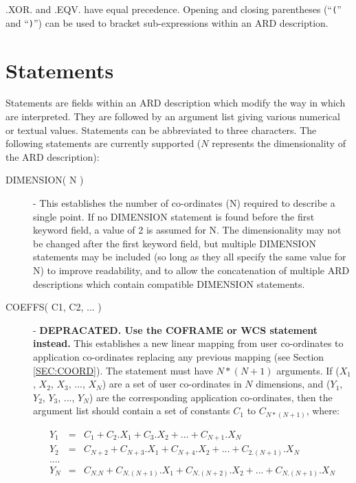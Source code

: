 .XOR. and .EQV. have equal precedence. Opening and closing parentheses
(``\verb+(+'' and ``\verb+)+'') can be used to bracket sub-expressions within 
an ARD description. 

\section{\label{SEC:STAT}Statements}
Statements are fields within an ARD description which modify the way in
which  are interpreted. They are followed by
an argument list giving various numerical or textual values. Statements can be
abbreviated to three characters. The following statements are currently
supported ($N$ represents the dimensionality of the ARD description):

\begin{description}

\item [\label{ST:DIM}DIMENSION( N )] - This establishes the number of
co-ordinates (N) required to describe a single point. If no DIMENSION
statement is found before the first keyword field, a value of 2 is
assumed for N. The dimensionality may not be changed after the first
keyword field, but multiple DIMENSION statements may be included (so long
as they all specify the same value for N) to improve readability, and to
allow the concatenation of multiple ARD descriptions which contain
compatible DIMENSION statements.

\item [\label{ST:COE}COEFFS( C1, C2, ... )] - {\bf DEPRACATED. Use the COFRAME or WCS statement instead.} This establishes
a new linear mapping from user co-ordinates to application co-ordinates 
replacing any previous mapping (see Section \ref{SEC:COORD}). The
statement must have $N*(N+1)$ arguments. If ($X_{1}$, $X_{2}$, $X_{3}$, ...,
$X_{N}$) are a set of user co-ordinates in $N$ dimensions, and ($Y_{1}$,
$Y_{2}$, $Y_{3}$, ..., $Y_{N}$) are the corresponding application co-ordinates,
then the argument list should contain a set of constants $C_{1}$ to
$C_{N*(N+1)}$, where: 

\begin{eqnarray*}
Y_{1} & = & C_{1} + C_{2}.X_{1} + C_{3}.X_{2} + ... + C_{N+1}.X_{N} \\
Y_{2} & = & C_{N+2} + C_{N+3}.X_{1} + C_{N+4}.X_{2} + ... + C_{2.(N+1)}.X_{N} \\
 ....\\
Y_{N} & = & C_{N.N} + C_{N.(N+1)}.X_{1} + C_{N.(N+2)}.X_{2} + ... + C_{N.(N+1)}.X_{N} 
\end{eqnarray*}


\end{description}
